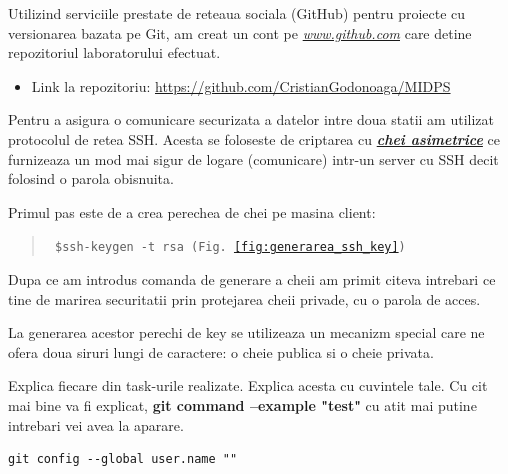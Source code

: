 \begin{flushleft} %
\end{flushleft}

Utilizind serviciile prestate de reteaua sociala (GitHub) pentru proiecte cu versionarea bazata pe Git, am creat un cont pe \emph{\url{www.github.com}} care detine repozitoriul laboratorului efectuat.

\newcommand*{\authorimg}[1]{%
	\raisebox{-.3\baselineskip}{%
		\texttt{[image: \#1]}%
	}%
}
\begin{itemize}
	\item[\authorimg{img/1.png}]
	\begin{center}
		Link la repozitoriu: \url{https://github.com/CristianGodonoaga/MIDPS}
	\end{center}
\end{itemize}


Pentru a asigura o comunicare securizata a datelor intre doua statii am utilizat protocolul de retea SSH. Acesta se foloseste de criptarea cu \emph{\textbf{\href{https://en.wikipedia.org/wiki/Public-key_cryptography}{chei asimetrice}}} ce furnizeaza un mod mai sigur de logare (comunicare) intr-un server cu SSH decit folosind o parola obisnuita.

Primul pas este de a crea perechea de chei pe masina client:

\begin{quote}\tt
	\$ssh-keygen -t rsa (Fig.~\ref{fig:generarea_ssh_key})
\end{quote}

Dupa ce am introdus comanda de generare a cheii am primit citeva intrebari ce tine de marirea securitatii prin protejarea cheii privade, cu o parola de acces.

La generarea acestor perechi de key se utilizeaza un mecanizm special care ne ofera doua siruri lungi de caractere: o cheie publica si o cheie privata.


Explica fiecare din task-urile realizate. Explica acesta cu cuvintele tale. Cu cit mai bine va fi explicat, 
\textbf{git command --example "test"}
cu atit mai putine intrebari vei avea la aparare.

\begin{lstlisting}
git config --global user.name ""
\end{lstlisting}

